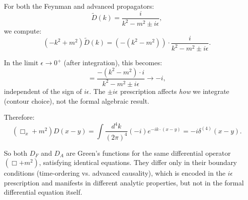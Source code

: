 \documentclass[11pt, a4paper]{article}
\newcommand{\be}{\begin{equation}}
\newcommand{\ee}{\end{equation}}
\begin{document}
For both the Feynman and advanced propagators:
\be
\tilde{D}(k) = \frac{i}{k^2 - m^2 \pm i\epsilon},
\ee
we compute:
\be
(-k^2 + m^2)\tilde{D}(k) = (-(k^2 - m^2)) \cdot \frac{i}{k^2 - m^2 \pm i\epsilon}.
\ee

In the limit $\epsilon \to 0^+$ (after integration), this becomes:
\be
= \frac{-(k^2-m^2) \cdot i}{k^2 - m^2 \pm i\epsilon} \to -i,
\ee
independent of the sign of $i\epsilon$. The $\pm i\epsilon$ prescription affects \emph{how} we integrate (contour choice), not the formal algebraic result.

Therefore:
\be
(\Box_x + m^2)D(x-y) = \int \frac{d^4k}{(2\pi)^4} (-i) e^{-ik\cdot(x-y)} = -i\delta^{(4)}(x-y).
\ee

So both $D_F$ and $D_A$ are Green's functions for the same differential operator $(\Box + m^2)$, satisfying identical equations. They differ only in their boundary conditions (time-ordering vs. advanced causality), which is encoded in the $i\epsilon$ prescription and manifests in different analytic properties, but not in the formal differential equation itself.
\end{document}

